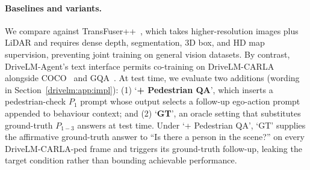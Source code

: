 \paragraph{Baselines and variants.}
We compare against TransFuser++~\cite{jaeger2023hidden}, which takes higher-resolution images plus LiDAR and requires dense depth, segmentation, 3D box, and HD map supervision, preventing joint training on general vision datasets. By contrast, DriveLM-Agent's text interface permits co-training on DriveLM-CARLA alongside COCO~\cite{lin2014microsoft} and GQA~\cite{hudson2019gqa}. At test time, we evaluate two additions (wording in Section~\ref{drivelm:app:impl}): (1) `\textbf{+ Pedestrian QA}', which inserts a pedestrian-check $P_1$ prompt whose output selects a follow-up ego-action prompt appended to behaviour context; and (2) `\textbf{GT}', an oracle setting that substitutes ground-truth $P_{1-3}$ answers at test time. Under `+ Pedestrian QA', `GT' supplies the affirmative ground-truth answer to ``Is there a person in the scene?'' on every DriveLM-CARLA-ped frame and triggers its ground-truth follow-up, leaking the target condition rather than bounding achievable performance.

